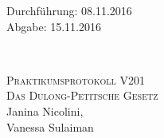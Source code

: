 



\begin{titlepage}
  \begin{flushleft}
 Durchführung: 08.11.2016\\
 Abgabe: 15.11.2016
  \end{flushleft}


\HRule\\[1,0cm]

 \begin{center}


\textsc{\LARGE Praktikumsprotokoll V201}\\[1.5cm]
\textsc{\huge Das Dulong-Petitsche Gesetz} \\[5,5cm]

Janina Nicolini\footnotemark[1], \\
Vanessa Sulaiman\footnotemark[2] \\[1,0cm]



 \end{center}
\HRule

 \vfill

\end{titlepage}






\printbibliography


